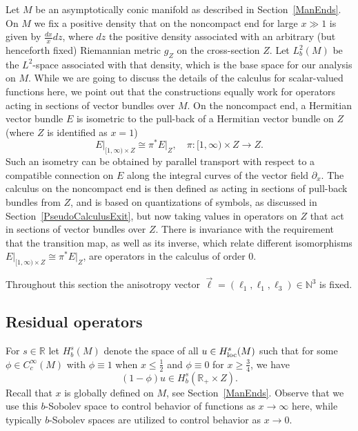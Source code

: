\documentclass[reqno]{amsart}
\numberwithin{equation}{section}
\theoremstyle{definition}
\def\N{\mathbb N}
\def\R{\mathbb R}
\begin{document}
\noindent
Let $M$ be an asymptotically conic manifold as described in Section~\ref{ManEnds}. On $M$ we fix a positive density that on the noncompact end for large $x \gg 1$ is given by $\frac{dx}{x}dz$, where $dz$ the positive density associated with an arbitrary (but henceforth fixed) Riemannian metric $g_Z$ on the cross-section $Z$. Let $L^2_b(M)$ be the $L^2$-space associated with that density, which is the base space for our analysis on $M$. While we are going to discuss the details of the calculus for scalar-valued functions here, we point out that the constructions equally work for operators acting in sections of vector bundles over $M$. On the noncompact end, a Hermitian vector bundle $E$ is isometric to the pull-back of a Hermitian vector bundle on $Z$ (where $Z$ is identified as $x=1$)
$$
E\big|_{[1,\infty)\times Z} \cong \pi^* E\big|_{Z}, \quad \pi : [1,\infty)\times Z \to Z.
$$
Such an isometry can be obtained by parallel transport with respect to a compatible connection on $E$ along the integral curves of the vector field $\partial_x$. The calculus on the noncompact end is then defined as acting in sections of pull-back bundles from $Z$, and is based on quantizations of symbols, as discussed in Section~\ref{PseudoCalculusExit}, but now taking values in operators on $Z$ that act in sections of vector bundles over $Z$. There is invariance with the requirement that the transition map, as well as its inverse, which relate different isomorphisms $E\big|_{[1,\infty)\times Z} \cong \pi^* E\big|_{Z}$, are operators in the calculus of order $0$.

\medskip

\noindent
Throughout this section the anisotropy vector $\vec{\ell} = (\ell_1,\ell_1,\ell_3) \in \N^3$ is fixed.

\subsection{Residual operators}

For $s \in \R$ let $H^s_b(M)$ denote the space of all $u \in H^{s}_{\textup{loc}}(M)$ such that for some $\phi \in C_c^{\infty}(M)$ with $\phi \equiv 1$ when $x \leq \frac{1}{2}$ and $\phi \equiv 0$ for $x \geq \frac{3}{4}$, we have
$$
(1 - \phi)u \in H^s_b(\R_+\times Z).
$$
Recall that $x$ is globally defined on $M$, see Section~\ref{ManEnds}. Observe that we use this $b$-Sobolev space to control behavior of functions as $x \to \infty$ here, while typically $b$-Sobolev spaces are utilized to control behavior as $x \to 0$.
\end{document}
